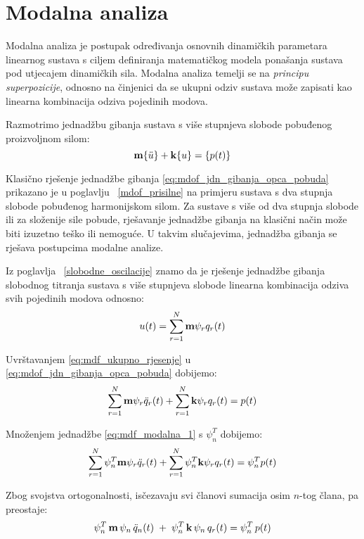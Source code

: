 \section{Modalna analiza}
Modalna analiza je postupak određivanja osnovnih dinamičkih parametara linearnog
sustava s ciljem definiranja matematičkog modela ponašanja sustava pod utjecajem
dinamičkih sila. Modalna analiza temelji se na \textit{principu superpozicije},
odnosno na činjenici da se ukupni odziv sustava može zapisati kao linearna
kombinacija odziva pojedinih modova.
\par

Razmotrimo jednadžbu gibanja sustava s više stupnjeva slobode pobuđenog proizvoljnom
silom:
\begin{equation}\label{eq:mdof_jdn_gibanja_opca_pobuda}
    \mathbf{m}\{\ddot{u}\} + \mathbf{k}\{u\} = \{p(t)\}
\end{equation}

Klasično rješenje jednadžbe gibanja \eqref{eq:mdof_jdn_gibanja_opca_pobuda}
prikazano je u poglavlju ~\ref{mdof_prisilne} na primjeru sustava s dva stupnja 
slobode pobuđenog harmonijskom silom. Za sustave s više od dva stupnja slobode ili
za složenije sile pobude, rješavanje jednadžbe gibanja na klasični način može biti
izuzetno teško ili nemoguće. U takvim slučajevima, jednadžba gibanja se rješava
postupcima modalne analize.
\par

Iz poglavlja ~\ref{slobodne_oscilacije} znamo da je rješenje jednadžbe gibanja
slobodnog titranja sustava s više stupnjeva slobode linearna kombinacija
odziva svih pojedinih modova odnosno:
\begin{equation}\label{eq:mdf_ukupno_rjesenje}
    u(t)=\sum_{r=1}^N\mathbf{m}\psi_rq_r(t)
\end{equation}

Uvrštavanjem \eqref{eq:mdf_ukupno_rjesenje} u \eqref{eq:mdof_jdn_gibanja_opca_pobuda} 
dobijemo:
\begin{equation}\label{eq:mdf_modalna_1}
    \sum_{r=1}^N\mathbf{m}\psi_r\ddot{q}_r(t) + \sum_{r=1}^N\mathbf{k}\psi_rq_r(t)=p(t)
\end{equation}

Množenjem jednadžbe \eqref{eq:mdf_modalna_1} s $\psi_n^T$ dobijemo:
\begin{equation}\label{eq:mdf_modalna_2}
    \sum_{r=1}^N\psi_n^T\mathbf{m}\psi_r\ddot{q}_r(t)+\sum_{r=1}^N\psi_n^T\mathbf{k}\psi_rq_r(t)=\psi_n^Tp(t)
\end{equation}

Zbog svojstva ortogonalnosti, isčezavaju svi članovi sumacija osim $n$-tog člana, pa
preostaje:
\begin{equation}\label{eq:mdf_modalna_jednadzba_nesredjeno}
    \psi_n^T\,\mathbf{m}\,\psi_n\,\ddot{q}_n(t)\;+\;\psi_n^T\,\mathbf{k}\,\psi_n\,q_r(t)=\psi_n^T\,p(t)
\end{equation}

